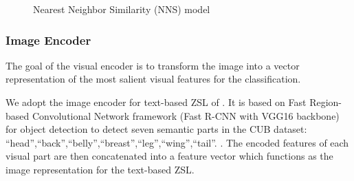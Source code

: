 \documentclass[11pt,a4paper]{article}
\newcommand\gal[1]{\textcolor{bright}{\textbf{GAL:} #1 }}
\begin{document}





\begin{figure}[t]
\centering
{}
 \caption{Nearest Neighbor Similarity (NNS) model}
\label{fig:DS}
\end{figure}

\subsubsection{Image Encoder}
\label{section:Image_Encoder}
The goal of the visual encoder is to transform the image into a vector representation of the most salient visual features for the classification. 

We adopt the image encoder for text-based ZSL of \citet{zhang2016spda, zhu2018generative,elhoseiny2017link}. It is based on Fast Region-based Convolutional Network framework (Fast R-CNN with VGG16 backbone) for object detection \citep{girshick2015fast} to detect seven semantic parts in the CUB dataset:
\enquote{head},\enquote{back},\enquote{belly},\enquote{breast},\enquote{leg},\enquote{wing},\enquote{tail}. 
. The encoded features of each visual part are then concatenated into a feature vector which functions as the image representation for the text-based ZSL.


\end{document}
